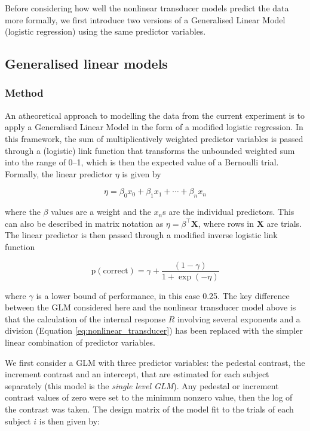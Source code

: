 \documentclass[11pt,a4paper]{article}
\begin{document}
Before considering how well the nonlinear transducer models predict the data more formally, we first introduce two versions of a Generalised Linear Model (logistic regression) using the same predictor variables.


\subsection{Generalised linear models}

\subsubsection{Method}

An atheoretical approach to modelling the data from the current experiment is to apply a Generalised Linear Model in the form of a modified logistic regression.
In this framework, the sum of multiplicatively weighted predictor variables is passed through a (logistic) link function that transforms the unbounded weighted sum into the range of 0--1, which is then the expected value of a Bernoulli trial.
Formally, the linear predictor $\eta$ is given by

\begin{equation}
\label{eq:linear_predictor}
\eta = \beta_0 x_0 + \beta_1 x_1 + \cdots + \beta_n x_n
\end{equation}

where the $\beta$ values are a weight and the $x_n$s are the individual predictors.
This can also be described in matrix notation as $\eta = \beta^\intercal \mathbf{X}$, where rows in $\mathbf{X}$ are trials.
The linear predictor is then passed through a modified inverse logistic link function

\begin{equation}
\label{eq:logit_link}
\mathrm{p(correct)} = \gamma +  \frac{(1 - \gamma)}{1 + \exp(-\eta)}
\end{equation}

where $\gamma$ is a lower bound of performance, in this case 0.25.
The key difference between the GLM considered here and the nonlinear transducer model above is that the calculation of the internal response $R$ involving several exponents and a division (Equation \ref{eq:nonlinear_transducer}) has been replaced with the simpler linear combination of predictor variables.

We first consider a GLM with three predictor variables: the pedestal contrast, the increment contrast and an intercept, that are estimated for each subject separately (this model is the \textit{single level GLM}).
Any pedestal or increment contrast values of zero were set to the minimum nonzero value, then the log of the contrast was taken.
The design matrix of the model fit to the trials of each subject $i$ is then given by:
\end{document}
